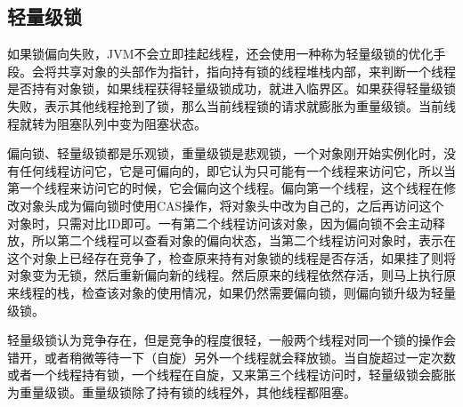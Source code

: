 \documentclass[a4paper]{report}
\begin{document}
\subsection{轻量级锁}
如果锁偏向失败，JVM不会立即挂起线程，还会使用一种称为轻量级锁的优化手段。会将共享对象的头部作为指针，指向持有锁的线程堆栈内部，来判断一个线程是否持有对象锁，如果线程获得轻量级锁成功，就进入临界区。如果获得轻量级锁失败，表示其他线程抢到了锁，那么当前线程锁的请求就膨胀为重量级锁。当前线程就转为阻塞队列中变为阻塞状态。

偏向锁、轻量级锁都是乐观锁，重量级锁是悲观锁，一个对象刚开始实例化时，没有任何线程访问它，它是可偏向的，即它认为只可能有一个线程来访问它，所以当第一个线程来访问它的时候，它会偏向这个线程。偏向第一个线程，这个线程在修改对象头成为偏向锁时使用CAS操作，将对象头中改为自己的，之后再访问这个对象时，只需对比ID即可。一有第二个线程访问该对象，因为偏向锁不会主动释放，所以第二个线程可以查看对象的偏向状态，当第二个线程访问对象时，表示在这个对象上已经存在竞争了，检查原来持有对象锁的线程是否存活，如果挂了则将对象变为无锁，然后重新偏向新的线程。然后原来的线程依然存活，则马上执行原来线程的栈，检查该对象的使用情况，如果仍然需要偏向锁，则偏向锁升级为轻量级锁。

轻量级锁认为竞争存在，但是竞争的程度很轻，一般两个线程对同一个锁的操作会错开，或者稍微等待一下（自旋）另外一个线程就会释放锁。当自旋超过一定次数或者一个线程持有锁，一个线程在自旋，又来第三个线程访问时，轻量级锁会膨胀为重量级锁。重量级锁除了持有锁的线程外，其他线程都阻塞。
\end{document}
